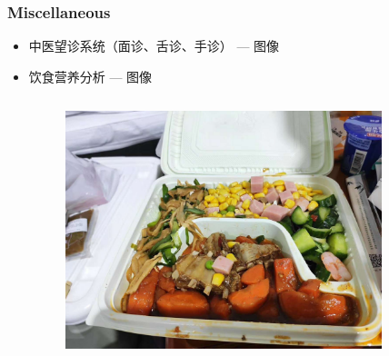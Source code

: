
\begin{frame}
\frametitle{Miscellaneous}

\begin{itemize}
    \item<2-> 中医望诊系统（面诊、舌诊、手诊） --- 图像
    \item<3-> 饮食营养分析 --- 图像
    \begin{columns}
    \begin{column}{0.45\textwidth}
    \begin{figure}
        \centering
        \includegraphics[width=1\textwidth,keepaspectratio]{images/diet_img.jpg}
    \end{figure}
    \end{column}
    \begin{column}{0.24\textwidth}
    \begin{figure}
        \centering

\end{figure}
\end{column}
\end{columns}
\end{itemize}
\end{frame}
